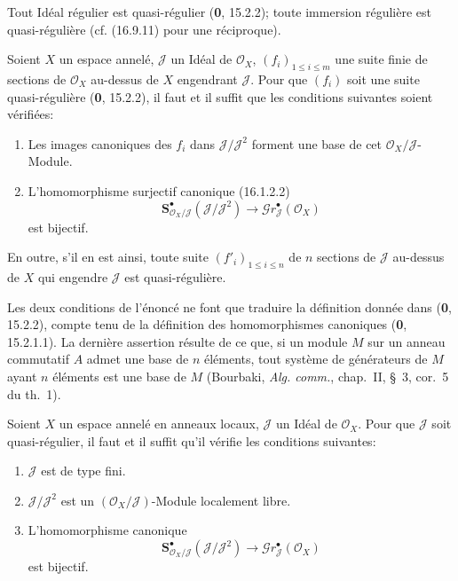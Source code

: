 Tout Idéal régulier est quasi-régulier (\textbf{0}, 15.2.2); toute immersion régulière
est quasi-régulière (cf. (16.9.11) pour une réciproque).

\begin{proposition}[16.9.3]
\label{IV.16.9.3}
Soient $X$ un espace annelé, $\mathscr{J}$ un Idéal de $\mathcal{O}_X$,
$(f_i)_{1\leq i\leq m}$ une suite finie de sections de $\mathcal{O}_X$
au-dessus de $X$ engendrant $\mathscr{J}$. Pour que $(f_i)$ soit une suite
quasi-régulière \textup{(\textbf{0}, 15.2.2)}, il faut et il suffit que les conditions suivantes
soient vérifiées:
\begin{enumerate}
  \item[\textup{(i)}] Les images canoniques des $f_i$ dans
  $\mathscr{J}/\mathscr{J}^2$ forment une base de cet
  $\mathcal{O}_X/\mathscr{J}$-Module.
  \item[\textup{(ii)}] L'homomorphisme surjectif canonique \textup{(16.1.2.2)}
  \[
    \mathbf{S}_{\mathcal{O}_X/\mathscr{J}}^{\bullet}
    (\mathscr{J}/\mathscr{J}^2)
    \longrightarrow\mathscr{G}r_{\mathscr{J}}^{\bullet}(\mathcal{O}_X)
  \]
  est bijectif.
\end{enumerate}

En outre, s'il en est ainsi, toute suite $(f'_i)_{1\leq i\leq n}$ de $n$
sections de $\mathscr{J}$ au-dessus de $X$ qui engendre $\mathscr{J}$ est
quasi-régulière.
\end{proposition}


Les deux conditions de l'énoncé ne font que traduire la définition donnée dans
(\textbf{0}, 15.2.2), compte tenu de la définition des homomorphismes canoniques
(\textbf{0}, 15.2.1.1). La dernière assertion résulte de ce que, si un module $M$ sur
un anneau commutatif $A$ admet une base de $n$ éléments, tout système de
générateurs de $M$ ayant $n$ éléments est une base de $M$ (Bourbaki,
\emph{Alg. comm.}, chap.~II, §~3, cor.~5 du th.~1).

\begin{corollary}[16.9.4]
\label{IV.16.9.4}
Soient $X$ un espace annelé en anneaux locaux, $\mathscr{J}$ un Idéal de
$\mathcal{O}_X$. Pour que $\mathscr{J}$ soit quasi-régulier, il faut et il
suffit qu'il vérifie les conditions suivantes:
\begin{enumerate}
  \item[\textup{(i)}] $\mathscr{J}$ est de type fini.
  \item[\textup{(ii)}] $\mathscr{J}/\mathscr{J}^2$ est un
  $(\mathcal{O}_X/\mathscr{J})$-Module localement libre.
  \item[\textup{(iii)}] L'homomorphisme canonique
  \[
    \mathbf{S}_{\mathcal{O}_X/\mathscr{J}}^{\bullet}
    (\mathscr{J}/\mathscr{J}^2)
    \longrightarrow\mathscr{G}r_{\mathscr{J}}^{\bullet}(\mathcal{O}_X)
    \tag{16.9.4.1}
    \label{IV.16.9.4.1}
  \]
  est bijectif.
\end{enumerate}
\end{corollary}

